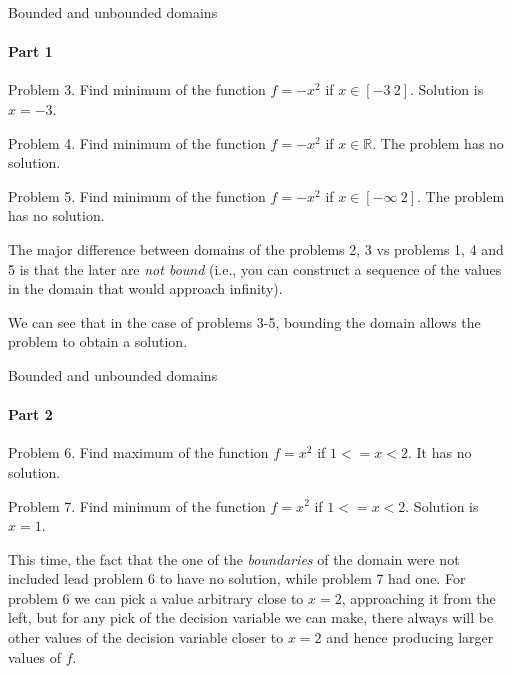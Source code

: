 \documentclass{beamer}
\begin{document}
\begin{frame}{Bounded and unbounded domains}
\framesubtitle{Part 1}
\begin{flushleft}

Problem 3. Find minimum of the function $f = -x^2$ if $x \in [-3 \ 2]$. Solution is $x = -3$.

\bigskip

Problem 4. Find minimum of the function $f = -x^2$ if $x \in \mathbb{R}$. The problem has no solution.

\bigskip

Problem 5. Find minimum of the function $f = -x^2$ if $x \in  [-\infty \ 2]$. The problem has no solution.

\bigskip

The major difference between domains of the problems 2, 3 vs problems 1, 4 and 5 is that the later are \emph{not bound} (i.e., you can construct a sequence of the values in the domain that would approach infinity).

\bigskip

We can see that in the case of problems 3-5, bounding the domain allows the problem to obtain a solution.
 
\end{flushleft}
\end{frame}



\begin{frame}{Bounded and unbounded domains}
\framesubtitle{Part 2}
\begin{flushleft}

Problem 6. Find maximum of the function $f = x^2$ if $1 <=x < 2$. It has no solution.

\bigskip

Problem 7. Find minimum of the function $f = x^2$ if $1 <=x < 2$. Solution is $x = 1$.

\bigskip

This time, the fact that the one of the \emph{boundaries} of the domain were not included lead problem 6 to have no solution, while problem 7 had one. For problem 6 we can pick a value arbitrary close to $x = 2$, approaching it from the left, but for any pick of the decision variable we can make, there always will be other values of the decision variable closer to $x = 2$ and hence producing larger values of $f$.
 
\end{flushleft}
\end{frame}
\end{document}

